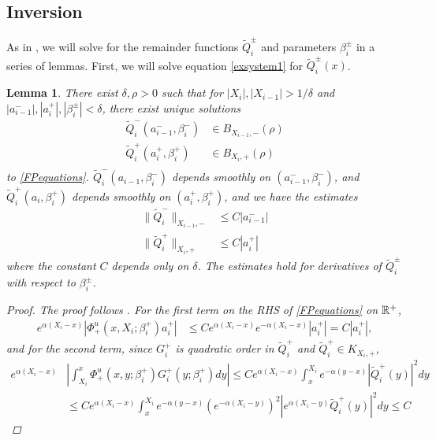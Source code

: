\documentclass[10pt,reqno]{amsart}
\theoremstyle{plain}
\newtheorem{lemma}[theorem]{Lemma}
\theoremstyle{definition}
\theoremstyle{remark}
\numberwithin{theorem}{section}
\numberwithin{equation}{section}
\begin{document}
\subsection{Inversion}

As in \cite{Sandstede1997}, we will solve for the remainder functions $\tilde{Q}_i^\pm$ and parameters $\beta_i^\pm$ in a series of lemmas. First, we will solve equation \cref{exsystem1} for $\tilde{Q}_i^\pm(x)$.

\begin{lemma}\label{solveforV}
There exist $\delta, \rho > 0$ such that for $|X_i|, |X_{i-1}| > 1/\delta$ and $|a_{i-1}^-|, |a_i^+|, |\beta_i^\pm| < \delta$, there exist unique solutions
\begin{align*}
\tilde{Q}_i^-(a_{i-1}^-, \beta_i^-) &\in B_{X_{i-1}, -}(\rho) \\
\tilde{Q}_i^+(a_i^+, \beta_i^+) &\in B_{X_i, +}(\rho) \\
\end{align*}
to \eqref{FPequations}. $\tilde{Q}_i^-(a_{i-1}, \beta_i^-)$ depends smoothly on $(a_{i-1}^-, \beta_i^-)$, and $\tilde{Q}_i^+(a_i, \beta_i^+)$ depends smoothly on $(a_i^+, \beta_i^+)$, and we have the estimates
\begin{equation}\label{Vest}
\begin{aligned}
\|\tilde{Q}_i^-\|_{X_{i-1}, -} &\leq C |a_{i-1}^-| \\
\|\tilde{Q}_i^+\|_{X_i, +} &\leq C |a_i^+|
\end{aligned}
\end{equation}
where the constant $C$ depends only on $\delta$. The estimates hold for derivatives of $\tilde{Q}_i^\pm$ with respect to $\beta_i^\pm$.
\begin{proof}
The proof follows \cite[Lemma 5.2]{Sandstede1997}. For the first term on the RHS of \eqref{FPequations} on $\mathbb{R}^+$,
\begin{align*}
e^{\alpha(X_i - x)} | \Phi^u_+(x, X_i; \beta_i^+) a_i^+ | 
&\leq C e^{\alpha(X_i - x)} e^{-\alpha(X_i - x)} |a_i^+| = C |a_i^+|,
\end{align*}
and for the second term, since $G_i^+$ is quadratic order in $\tilde{Q}_i^+$ and $\tilde{Q}_i^+ \in K_{X_i, +}$, 
\begin{align*}
e^{\alpha(X_i - x)} &\left| \int_{X_i}^x \Phi_+^u(x, y; \beta_i^+) G_i^+(y; \beta_i^+)dy  \right| 
\leq C e^{\alpha(X_i - x)} \int_x^{X_i} e^{-\alpha(y - x)}|\tilde{Q}_i^+(y)|^2 dy \\
&\leq C e^{\alpha(X_i - x)} \int_x^{X_i} 
e^{-\alpha(y - x)}(e^{-\alpha(X_i - y)})^2|e^{\alpha(X_i - y)} \tilde{Q}_i^+(y)|^2 dy \leq C

\end{align*}
\end{proof}
\end{lemma}
\end{document}
